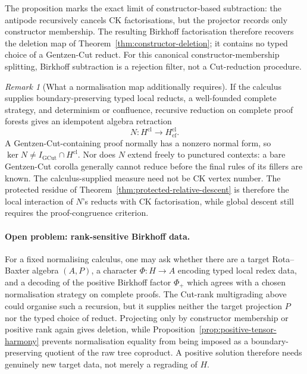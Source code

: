 \documentclass[10pt,a4paper]{article}
\theoremstyle{plain}
\theoremstyle{definition}
\theoremstyle{remark}
\newtheorem{remark}[theorem]{Remark}
\begin{document}
The proposition marks the exact limit of constructor-based subtraction:
the antipode recursively cancels CK factorisations, but the projector
records only constructor membership.  The resulting Birkhoff factorisation
therefore recovers the deletion map of
Theorem~\ref{thm:constructor-deletion}; it contains no typed choice of a
Gentzen-Cut reduct.  For this canonical constructor-membership splitting,
Birkhoff subtraction is a rejection filter, not a Cut-reduction
procedure.

\begin{remark}[What a normalisation map additionally requires]
\label{rem:conditional-normalisation}
If the calculus supplies boundary-preserving typed local reducts, a
well-founded complete strategy, and determinism or confluence, recursive
reduction on complete proof forests gives an idempotent algebra retraction
\[
 N:H^{\mathrm{cl}}\longrightarrow H_{\mathrm{cf}}^{\mathrm{cl}}.
\]
A Gentzen-Cut-containing proof normally has a nonzero normal form, so
\(\ker N\ne I_{\mathrm{GCut}}\cap H^{\mathrm{cl}}\).  Nor does \(N\)
extend freely to
punctured contexts: a bare Gentzen-Cut corolla generally cannot reduce
before the final rules of its fillers are known.  The calculus-supplied
measure need not be CK vertex number.  The protected residue of
Theorem~\ref{thm:protected-relative-descent} is therefore the local
interaction of \(N\)'s reducts with CK factorisation, while global descent
still requires the proof-congruence criterion.
\end{remark}

\paragraph{Open problem: rank-sensitive Birkhoff data.}
For a fixed normalising calculus, one may ask whether there are a target
Rota--Baxter algebra \((A,P)\), a character
\(\Phi:H\to A\) encoding typed local redex data, and a decoding of the
positive Birkhoff factor \(\Phi_+\) which agrees with a chosen normalisation
strategy on complete proofs.  The Cut-rank multigrading above could organise
such a recursion, but it supplies neither the target projection \(P\) nor
the typed choice of reduct.  Projecting only by constructor membership or
positive rank again gives deletion, while
Proposition~\ref{prop:positive-tensor-harmony} prevents normalisation
equality from being imposed as a boundary-preserving quotient of the raw
tree coproduct.  A positive solution therefore needs genuinely new target
data, not merely a regrading of \(H\).
\end{document}
